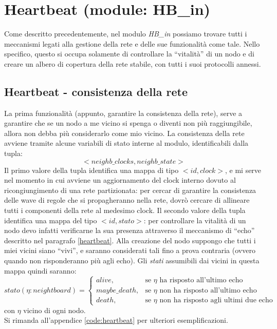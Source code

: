\documentclass[italian]{memoir}
\begin{document}
\section{Heartbeat (module: HB\_in)}\label{impl:hbin}
Come descritto precedentemente, nel modulo \textit{HB\_in} possiamo trovare tutti i meccanismi legati alla gestione della rete e delle sue funzionalità come tale. Nello specifico, questo si occupa solamente di controllare la ``vitalità'' di un nodo e di creare un albero di copertura della rete stabile, con tutti i suoi protocolli annessi.

\subsection{Heartbeat - consistenza della rete}
La prima funzionalità (appunto, garantire la consistenza della rete), serve a garantire che se un nodo a me vicino si spenga o diventi non più raggiungibile, allora non debba più considerarlo come mio vicino. La consistenza della rete avviene tramite alcune variabili di stato interne al modulo, identificabili dalla tupla:
$$
    <neighb\_clocks, neighb\_state>
$$
Il primo valore della tupla identifica una mappa di tipo $<id, clock>$, e mi serve nel momento in cui avviene un aggiornamento del clock interno dovuto al ricongiungimento di una rete partizionata: per cercar di garantire la consistenza delle wave di regole che si propagheranno nella rete, dovrò cercare di allineare tutti i componenti della rete al medesimo clock.
Il secondo valore della tupla identifica una mappa del tipo $<id, stato>$: per controllare la vitalità di un nodo devo infatti verificarne la sua presenza attraverso il meccanismo di ``echo'' descritto nel paragrafo \ref{heartbeat}. Alla creazione del nodo suppongo che tutti i miei vicini siano ``vivi'', e saranno considerati tali fino a prova contraria (ovvero quando non risponderanno più agli echo). Gli \emph{stati} assumibili dai vicini in questa mappa quindi saranno:
$$
stato(\eta:neightboard)=\begin{cases}
                         alive, & \mbox{se }\eta\mbox{ ha risposto all'ultimo echo} \\
                         maybe\_death, & \mbox{se }\eta\mbox{ non ha risposto all'ultimo echo}\\
                         death, & \mbox{se }\eta\mbox{ non ha risposto agli ultimi due echo}
                   \end{cases}
$$
con $\eta$ vicino di ogni nodo.\\
Si rimanda all'appendice \ref{code:heartbeat} per ulteriori esemplificazioni.
\end{document}
